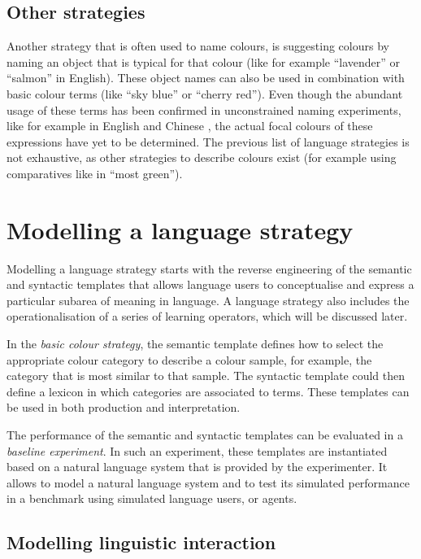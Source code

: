 \subsection{Other strategies}

Another strategy that is often used to name colours, is suggesting
colours by naming an object that is typical for that colour (like for
example ``lavender'' or ``salmon'' in English). These object names can
also be used in combination with basic colour terms (like ``sky blue''
or ``cherry red''). Even though the abundant usage of these terms has
been confirmed in unconstrained naming experiments, like for example
in English and Chinese \citep{lin01unconstrained}, the actual focal
colours of these expressions have yet to be determined. The previous
list of language strategies is not exhaustive, as other strategies to
describe colours exist (for example using comparatives like in ``most
green'').

\section{Modelling a language strategy}

Modelling a language strategy starts with the reverse engineering of
the semantic and syntactic templates that allows language users to
conceptualise and express a particular subarea of meaning in
language. A language strategy also includes the operationalisation of
a series of learning operators, which will be discussed later.

In the \emph{basic colour strategy}, the semantic template defines how
to select the appropriate colour category to describe a colour sample,
for example, the category that is most similar to that sample. The
syntactic template could then define a lexicon in which categories are
associated to terms. These templates can be used in both production
and interpretation.

The performance of the semantic and syntactic templates can be
evaluated in a \emph{baseline experiment}. 
In such an experiment, these templates are instantiated
based on a natural language system that is provided by the
experimenter. It allows to model a natural language system and to test
its simulated performance in a benchmark using simulated language
users, or agents.

\subsection{Modelling linguistic interaction}
\label{s:intro-language-games}

